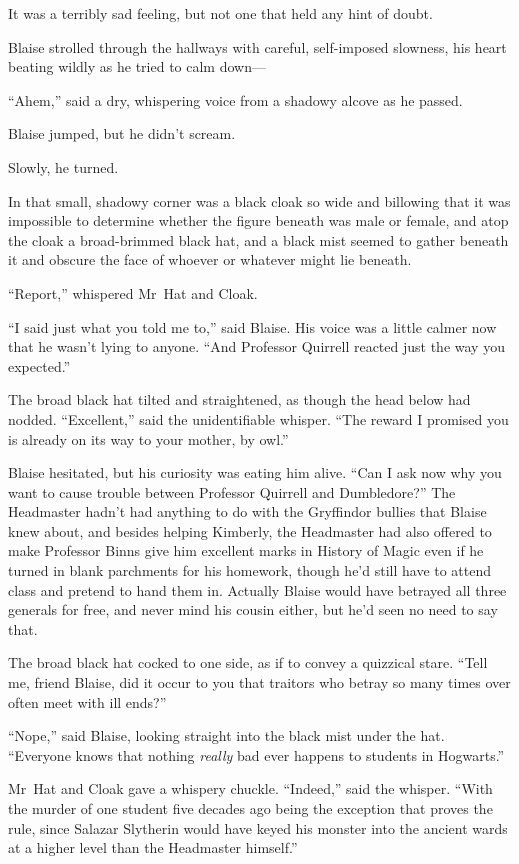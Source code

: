 It was a terribly sad feeling, but not one that held any hint of doubt. 

Blaise strolled through the hallways with careful, self-imposed slowness, his heart beating wildly as he tried to calm down—

“Ahem,” said a dry, whispering voice from a shadowy alcove as he passed.

Blaise jumped, but he didn’t scream.

Slowly, he turned.

In that small, shadowy corner was a black cloak so wide and billowing that it was impossible to determine whether the figure beneath was male or female, and atop the cloak a broad-brimmed black hat, and a black mist seemed to gather beneath it and obscure the face of whoever or whatever might lie beneath.

“Report,” whispered Mr~Hat and Cloak.

“I said just what you told me to,” said Blaise. His voice was a little calmer now that he wasn’t lying to anyone. “And Professor Quirrell reacted just the way you expected.”

The broad black hat tilted and straightened, as though the head below had nodded. “Excellent,” said the unidentifiable whisper. “The reward I promised you is already on its way to your mother, by owl.”

Blaise hesitated, but his curiosity was eating him alive. “Can I ask now why you want to cause trouble between Professor Quirrell and Dumbledore?” The Headmaster hadn’t had anything to do with the Gryffindor bullies that Blaise knew about, and besides helping Kimberly, the Headmaster had also offered to make Professor Binns give him excellent marks in History of Magic even if he turned in blank parchments for his homework, though he’d still have to attend class and pretend to hand them in. Actually Blaise would have betrayed all three generals for free, and never mind his cousin either, but he’d seen no need to say that.

The broad black hat cocked to one side, as if to convey a quizzical stare. “Tell me, friend Blaise, did it occur to you that traitors who betray so many times over often meet with ill ends?”

“Nope,” said Blaise, looking straight into the black mist under the hat. “Everyone knows that nothing \emph{really} bad ever happens to students in Hogwarts.”

Mr~Hat and Cloak gave a whispery chuckle. “Indeed,” said the whisper. “With the murder of one student five decades ago being the exception that proves the rule, since Salazar Slytherin would have keyed his monster into the ancient wards at a higher level than the Headmaster himself.”

